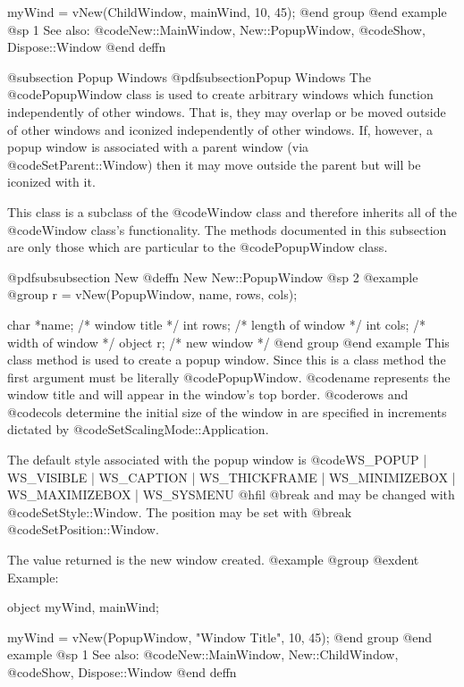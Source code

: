 myWind = vNew(ChildWindow, mainWind, 10, 45);
@end group
@end example
@sp 1
See also:  @code{New::MainWindow, New::PopupWindow,}
      @code{Show, Dispose::Window}
@end deffn








@subsection Popup Windows
@pdfsubsection{Popup Windows}
The @code{PopupWindow} class is used to create arbitrary windows which
function independently of other windows.  That is, they may overlap or
be moved outside of other windows and iconized independently of other
windows.  If, however, a popup window is associated with a parent window
(via @code{SetParent::Window}) then it may move outside the parent but
will be iconized with it.

This class is a subclass of the @code{Window} class and therefore
inherits all of the @code{Window} class's functionality.  The methods
documented in this subsection are only those which are particular
to the @code{PopupWindow} class.






@pdfsubsubsection {New}
@deffn {New} New::PopupWindow
@sp 2
@example
@group
r = vNew(PopupWindow, name, rows, cols);

char    *name;  /*  window title      */
int     rows;   /*  length of window  */
int     cols;   /*  width of window   */
object  r;      /*  new window        */
@end group
@end example
This class method is used to create a popup window.  Since this is a
class method the first argument must be literally @code{PopupWindow}.
@code{name} represents the window title and will appear in the window's
top border.  @code{rows} and @code{cols} determine the initial size of
the window in are specified in increments dictated by
@code{SetScalingMode::Application}.

The default style associated with the popup window is @code{WS_POPUP |
WS_VISIBLE | WS_CAPTION | WS_THICKFRAME | WS_MINIMIZEBOX |
WS_MAXIMIZEBOX | WS_SYSMENU} @hfil @break and may be changed with
@code{SetStyle::Window}.  The position may be set with
@break @code{SetPosition::Window}.

The value returned is the new window created.
@example
@group
@exdent Example:

object  myWind, mainWind;

myWind = vNew(PopupWindow, "Window Title", 10, 45);
@end group
@end example
@sp 1
See also:  @code{New::MainWindow, New::ChildWindow,}
      @code{Show, Dispose::Window}
@end deffn





